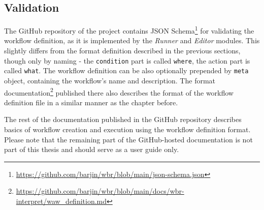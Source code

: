 \subsection{Validation}

The GitHub repository of the project contains JSON Schema\footnote{\href{https://github.com/barjin/wbr/blob/main/json-schema.json}{https://github.com/barjin/wbr/blob/main/json-schema.json}} for validating the workflow definition,
as it is implemented by the \textit{Runner} and \textit{Editor} modules. 
This slightly differs from the format definition described in the previous sections, though only by naming - the \texttt{condition} part is called \texttt{where}, the action part is called \texttt{what}.
The workflow definition can be also optionally prepended by \texttt{meta} object, containing the workflow's name and description.
The format documentation\footnote{\href{https://github.com/barjin/wbr/blob/main/docs/wbr-interpret/waw\_definition.md}{https://github.com/barjin/wbr/blob/main/docs/wbr-interpret/waw\_definition.md}} published there also describes 
the format of the workflow definition file in a similar manner as the chapter before. 

The rest of the documentation published in the GitHub repository describes basics of workflow creation and execution using the workflow definition format.
Please note that the remaining part of the GitHub-hosted documentation is not part of this thesis and should serve as a user guide only.